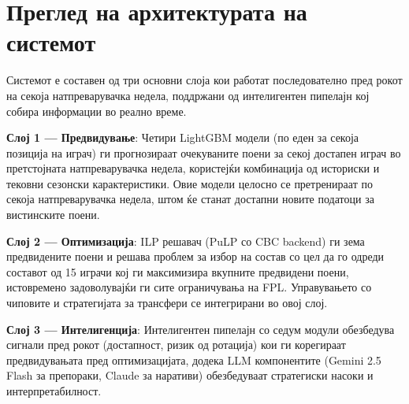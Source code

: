 
\section{Преглед на архитектурата на системот}

Системот е составен од три основни слоја кои работат последователно пред рокот на секоја натпреварувачка недела, поддржани од интелигентен пипелајн кој собира информации во реално време.

\textbf{Слој 1 — Предвидување}: Четири LightGBM модели (по еден за секоја позиција на играч) ги прогнозираат очекуваните поени за секој достапен играч во претстојната натпреварувачка недела, користејќи комбинација од историски и тековни сезонски карактеристики. Овие модели целосно се претренираат по секоја натпреварувачка недела, штом ќе станат достапни новите податоци за вистинските поени.

\textbf{Слој 2 — Оптимизација}: ILP решавач (PuLP со CBC backend) ги зема предвидените поени и решава проблем за избор на состав со цел да го одреди составот од 15 играчи кој ги максимизира вкупните предвидени поени, истовремено задоволувајќи ги сите ограничувања на FPL. Управувањето со чиповите и стратегијата за трансфери се интегрирани во овој слој.

\textbf{Слој 3 — Интелигенција}: Интелигентен пипелајн со седум модули обезбедува сигнали пред рокот (достапност, ризик од ротација) кои ги корегираат предвидувањата пред оптимизацијата, додека LLM компонентите (Gemini 2.5 Flash за препораки, Claude за наративи) обезбедуваат стратегиски насоки и интерпретабилност.

